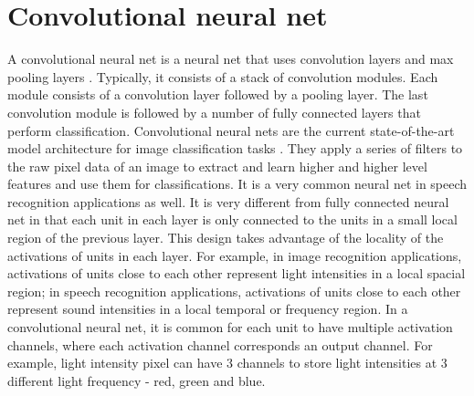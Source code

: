 \documentclass[12pt]{WSUThesis}
\theoremstyle{definition}
\begin{document}
\section{Convolutional neural net}
A convolutional neural net is a neural net that uses convolution layers and max pooling layers \cite{krizhevsky2009learning}. Typically, it consists of a stack of convolution modules. Each module consists of a convolution layer followed by a pooling layer.
The last convolution module is followed by a number of fully connected layers that perform classification.
Convolutional neural nets are the current state-of-the-art model architecture for image classification tasks \cite{szegedy2015going} \cite{ioffe2015batch} \cite{szegedy2016rethinking}.
They apply a series of filters to the raw pixel data of an image to extract and learn higher and higher level features and use them  for classifications.
It is a very common neural net in speech recognition applications as well.
It is very different from fully connected neural net in that each unit in each layer is only connected to the units in a small local region of the previous layer.
This design takes advantage of the locality of the activations of units in each layer.
For example, in image recognition applications, activations of units close to each other represent light intensities in a local spacial region; in speech recognition applications, activations of units close to each other represent sound intensities in a local temporal or frequency region.
In a convolutional neural net, it is common for each unit to have multiple activation channels, where each activation channel corresponds an output channel.
For example, light intensity pixel can have 3 channels to store light intensities at 3 different light frequency - red, green and blue.
\end{document}
